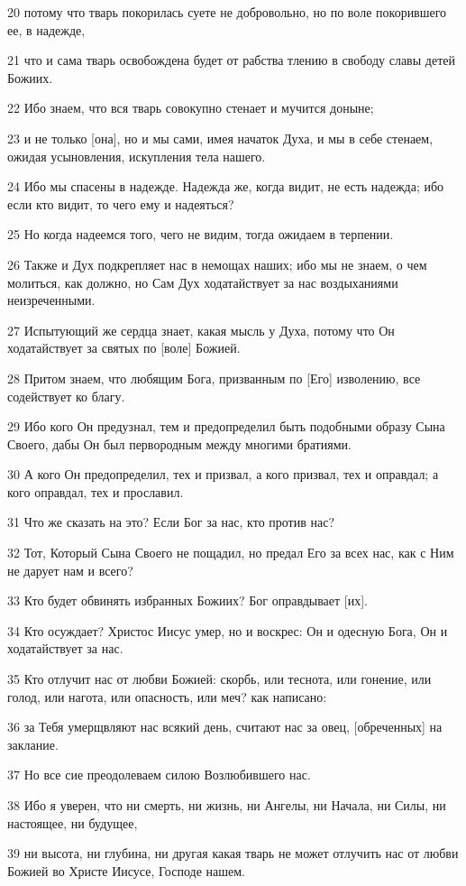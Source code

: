 \par 20 потому что тварь покорилась суете не добровольно, но по воле покорившего ее, в надежде,
\par 21 что и сама тварь освобождена будет от рабства тлению в свободу славы детей Божиих.
\par 22 Ибо знаем, что вся тварь совокупно стенает и мучится доныне;
\par 23 и не только [она], но и мы сами, имея начаток Духа, и мы в себе стенаем, ожидая усыновления, искупления тела нашего.
\par 24 Ибо мы спасены в надежде. Надежда же, когда видит, не есть надежда; ибо если кто видит, то чего ему и надеяться?
\par 25 Но когда надеемся того, чего не видим, тогда ожидаем в терпении.
\par 26 Также и Дух подкрепляет нас в немощах наших; ибо мы не знаем, о чем молиться, как должно, но Сам Дух ходатайствует за нас воздыханиями неизреченными.
\par 27 Испытующий же сердца знает, какая мысль у Духа, потому что Он ходатайствует за святых по [воле] Божией.
\par 28 Притом знаем, что любящим Бога, призванным по [Его] изволению, все содействует ко благу.
\par 29 Ибо кого Он предузнал, тем и предопределил быть подобными образу Сына Своего, дабы Он был первородным между многими братиями.
\par 30 А кого Он предопределил, тех и призвал, а кого призвал, тех и оправдал; а кого оправдал, тех и прославил.
\par 31 Что же сказать на это? Если Бог за нас, кто против нас?
\par 32 Тот, Который Сына Своего не пощадил, но предал Его за всех нас, как с Ним не дарует нам и всего?
\par 33 Кто будет обвинять избранных Божиих? Бог оправдывает [их].
\par 34 Кто осуждает? Христос Иисус умер, но и воскрес: Он и одесную Бога, Он и ходатайствует за нас.
\par 35 Кто отлучит нас от любви Божией: скорбь, или теснота, или гонение, или голод, или нагота, или опасность, или меч? как написано:
\par 36 за Тебя умерщвляют нас всякий день, считают нас за овец, [обреченных] на заклание.
\par 37 Но все сие преодолеваем силою Возлюбившего нас.
\par 38 Ибо я уверен, что ни смерть, ни жизнь, ни Ангелы, ни Начала, ни Силы, ни настоящее, ни будущее,
\par 39 ни высота, ни глубина, ни другая какая тварь не может отлучить нас от любви Божией во Христе Иисусе, Господе нашем.

